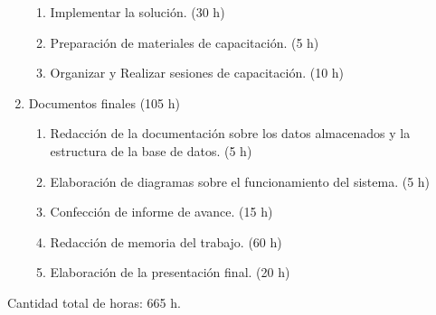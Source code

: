 \documentclass[
11pt, %
]{charter}
\begin{document}
\begin{enumerate}
\begin{enumerate}
	\item Implementar la solución. (30 h)
	\item Preparación de materiales de capacitación. (5 h)
	\item Organizar y Realizar sesiones de capacitación. (10 h)
	\end{enumerate}
\item Documentos finales (105 h)
	\begin{enumerate}
	\item Redacción de la documentación sobre los datos almacenados y la estructura de la base de datos. (5 h)
	\item Elaboración de diagramas sobre el funcionamiento del sistema. (5 h)
	\item Confección de informe de avance. (15 h)
	\item Redacción de memoria del trabajo. (60 h)
	\item Elaboración de la presentación final. (20 h)
	\end{enumerate}
\end{enumerate}

Cantidad total de horas: 665 h.
\end{document}
